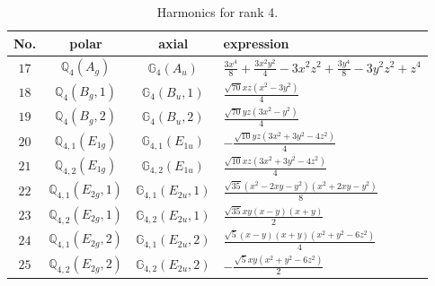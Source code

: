 \documentclass[fleqn,8pt,landscape]{jsarticle}
\begin{document}
\begin{table}[ht!]
\begin{center}
\caption{Harmonics for rank 4.}
\renewcommand{\arraystretch}{1.3}
\begin{tabular}{cccl} \hline \hline
No. & polar & axial & expression \\ \hline
$ 17 $ & $ \mathbb{Q}_{4}(A_{g}) $ & $ \mathbb{G}_{4}(A_{u}) $ & $ \frac{3 x^{4}}{8} + \frac{3 x^{2} y^{2}}{4} - 3 x^{2} z^{2} + \frac{3 y^{4}}{8} - 3 y^{2} z^{2} + z^{4} $ \\
$ 18 $ & $ \mathbb{Q}_{4}(B_{g},1) $ & $ \mathbb{G}_{4}(B_{u},1) $ & $ \frac{\sqrt{70} x z \left(x^{2} - 3 y^{2}\right)}{4} $ \\
$ 19 $ & $ \mathbb{Q}_{4}(B_{g},2) $ & $ \mathbb{G}_{4}(B_{u},2) $ & $ \frac{\sqrt{70} y z \left(3 x^{2} - y^{2}\right)}{4} $ \\
$ 20 $ & $ \mathbb{Q}_{4,1}(E_{1g}) $ & $ \mathbb{G}_{4,1}(E_{1u}) $ & $ - \frac{\sqrt{10} y z \left(3 x^{2} + 3 y^{2} - 4 z^{2}\right)}{4} $ \\
$ 21 $ & $ \mathbb{Q}_{4,2}(E_{1g}) $ & $ \mathbb{G}_{4,2}(E_{1u}) $ & $ \frac{\sqrt{10} x z \left(3 x^{2} + 3 y^{2} - 4 z^{2}\right)}{4} $ \\
$ 22 $ & $ \mathbb{Q}_{4,1}(E_{2g},1) $ & $ \mathbb{G}_{4,1}(E_{2u},1) $ & $ \frac{\sqrt{35} \left(x^{2} - 2 x y - y^{2}\right) \left(x^{2} + 2 x y - y^{2}\right)}{8} $ \\
$ 23 $ & $ \mathbb{Q}_{4,2}(E_{2g},1) $ & $ \mathbb{G}_{4,2}(E_{2u},1) $ & $ \frac{\sqrt{35} x y \left(x - y\right) \left(x + y\right)}{2} $ \\
$ 24 $ & $ \mathbb{Q}_{4,1}(E_{2g},2) $ & $ \mathbb{G}_{4,1}(E_{2u},2) $ & $ \frac{\sqrt{5} \left(x - y\right) \left(x + y\right) \left(x^{2} + y^{2} - 6 z^{2}\right)}{4} $ \\
$ 25 $ & $ \mathbb{Q}_{4,2}(E_{2g},2) $ & $ \mathbb{G}_{4,2}(E_{2u},2) $ & $ - \frac{\sqrt{5} x y \left(x^{2} + y^{2} - 6 z^{2}\right)}{2} $ \\
 \hline \hline
\end{tabular}
\end{center}
\end{table}
\end{document}
